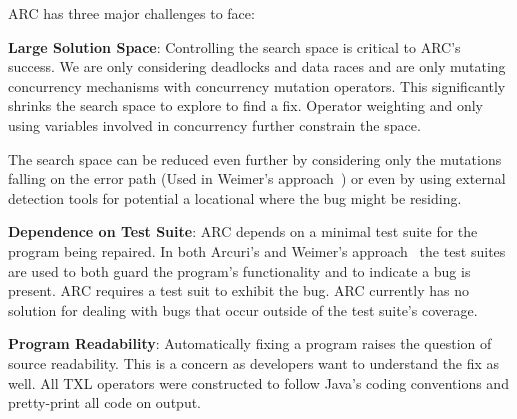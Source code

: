 \documentclass{llncs}
\begin{document}
ARC has three major challenges to face:

\textbf{Large Solution Space}: Controlling the search space is critical to ARC's
success.  We are only considering
deadlocks and data races and are only mutating concurrency mechanisms with concurrency
mutation operators. This significantly shrinks the search space to explore
to find a fix. Operator weighting and only using variables involved in concurrency
further constrain the space.

The search space can be reduced even further by considering only the mutations
falling on the error path (Used in Weimer's approach~\cite{GNFW11}) or even by
using external detection tools for potential a locational where the bug might
be residing.

\textbf{Dependence on Test Suite}: ARC depends on a minimal test suite for the
program being repaired. In both Arcuri's and Weimer's
approach~\cite{AY08,GNFW11} the test suites are used to both guard the
program's functionality and to indicate a bug is present. ARC requires a test
suit to exhibit the bug. ARC currently has no solution for dealing with bugs
that occur outside of the test suite's coverage.


\textbf{Program Readability}: Automatically fixing a program
raises the question of source readability. This is a concern as developers want to
understand the fix as well. All TXL operators were constructed to follow Java's
coding conventions and pretty-print all code on output.


\end{document}
